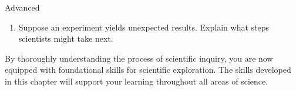 \begin{tieredquestions}{Advanced}
\begin{enumerate}
    \item Suppose an experiment yields unexpected results. Explain what steps scientists might take next.
\end{enumerate}
\end{tieredquestions}

By thoroughly understanding the process of scientific inquiry, you are now equipped with foundational skills for scientific exploration. The skills developed in this chapter will support your learning throughout all areas of science.

\FloatBarrier %